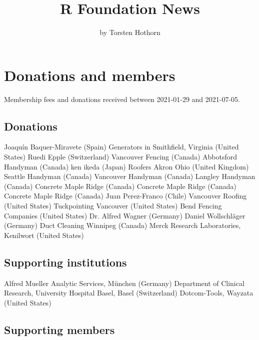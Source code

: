 
\title{R Foundation News}
\author{by Torsten Hothorn}

\maketitle

\section{Donations and members}

Membership fees and donations received between 
2021-01-29 and 2021-07-05.

\subsection{Donations}


Joaquín Baquer-Miravete (Spain)
Generators in Smithfield, Virginia (United States)
Ruedi Epple (Switzerland)
Vancouver Fencing (Canada)
Abbotsford Handyman (Canada)
ken ikeda (Japan)
Roofers Akron Ohio (United Kingdom)
Seattle Handyman (Canada)
Vancouver Handyman (Canada)
Langley Handyman (Canada)
Concrete Maple Ridge (Canada)
Concrete Maple Ridge (Canada)
Concrete Maple Ridge (Canada)
Juan Perez-Franco (Chile)
Vancouver Roofing (United States)
Tuckpointing Vancouver (United States)
Bend Fencing Companies (United States)
Dr. Alfred Wagner (Germany)
Daniel Wollschläger (Germany)
Duct Cleaning Winnipeg (Canada)
Merck Research Laboratories, Kenilwort (United States)

\subsection{Supporting institutions}


Alfred Mueller Analytic Services, München (Germany)
Department of Clinical Research, University Hospital Basel, Basel (Switzerland)
Dotcom-Tools, Wayzata (United States)

\subsection{Supporting members}


